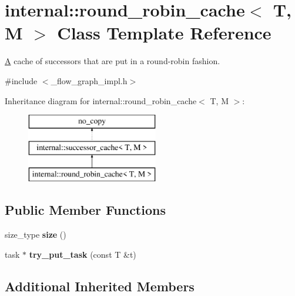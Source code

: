\hypertarget{classinternal_1_1round__robin__cache}{}\section{internal\+:\+:round\+\_\+robin\+\_\+cache$<$ T, M $>$ Class Template Reference}
\label{classinternal_1_1round__robin__cache}


\hyperlink{structA}{A} cache of successors that are put in a round-\/robin fashion.  




{\ttfamily \#include $<$\+\_\+flow\+\_\+graph\+\_\+impl.\+h$>$}

Inheritance diagram for internal\+:\+:round\+\_\+robin\+\_\+cache$<$ T, M $>$\+:\begin{figure}[H]
\begin{center}
\leavevmode
\includegraphics[height=3.000000cm]{classinternal_1_1round__robin__cache}
\end{center}
\end{figure}
\subsection*{Public Member Functions}
\begin{DoxyCompactItemize}
\item 
\hypertarget{classinternal_1_1round__robin__cache_a14da617e0bc97c288916c0fcae832e44}{}size\+\_\+type {\bfseries size} ()\label{classinternal_1_1round__robin__cache_a14da617e0bc97c288916c0fcae832e44}

\item 
\hypertarget{classinternal_1_1round__robin__cache_a6f02294fe9ee7bf9a59ce1f440276fc1}{}task $\ast$ {\bfseries try\+\_\+put\+\_\+task} (const T \&t)\label{classinternal_1_1round__robin__cache_a6f02294fe9ee7bf9a59ce1f440276fc1}

\end{DoxyCompactItemize}
\subsection*{Additional Inherited Members}


